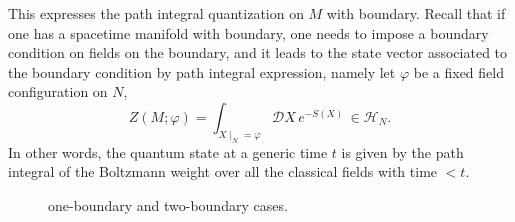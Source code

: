 This expresses the path integral quantization on $M$ with boundary.
Recall that if one has a spacetime manifold with boundary, one needs
to impose a boundary condition on fields on the boundary, and it leads
to the state vector associated to the boundary condition by path integral
expression, namely let $\varphi$ be a fixed field configuration on
$N$,
\begin{equation}
  Z\left(M;\varphi\right)  =  \int_{X\mid_{N}=\varphi}\mathcal{D}X \, e^{-S\left(X\right)} \,  \in  \mathcal{H}_{N}.
\end{equation}
 In other words, the quantum state at a generic time $t$ is given
by the path integral of the Boltzmann weight over all the classical
fields with time $<t$.


\begin{figure}
\centering
  \subfloat[\label{fig:one_bdy}]{
    \begin{tikzpicture}[scale=1] %
        \def\bdyradius{0.8cm}

        \draw[thick] (0,-\bdyradius) arc[start angle=-90,end angle=90,x radius=1.8cm,y radius=\bdyradius] node[left=0.3,pos=0.5] {$M$};
        \draw[very thick, red!50] (0,0) node[black] {$N$} circle[x radius=0.4cm,y radius=\bdyradius] node[above=\bdyradius+0.1cm, black] {\normalsize$\mathcal{H}_N$};

    \end{tikzpicture}
  }
\qquad\qquad
  \subfloat[\label{fig:two_bdy}]{
    \begin{tikzpicture}[scale=1] %
        \def\bdyradius{1cm}

        \draw[thick] (0,-\bdyradius) to[out=0,in=180] (1.4cm,0.3cm-\bdyradius) to[out=0,in=180] (4cm,0.2cm-\bdyradius*1.2);
        \draw[thick] (0,\bdyradius) to[out=0,in=180] (2.2cm,-0.2cm+\bdyradius) to[out=0,in=180] (4cm,0.2cm+\bdyradius*1.2);

        \draw[very thick, red!50] (0,0) node[black] {$-N_1$} circle[x radius=0.4cm,y radius=\bdyradius];
        \draw[very thick, red!50] (4,0.2) node[black] {$N_2$} circle[x radius=0.4cm,y radius=\bdyradius*1.2];

        \node at (2,0) {\small$\tilde M$};

    \end{tikzpicture}
  }
  \caption{one-boundary and two-boundary cases.}
  \label{fig:mfd_w_bdys}
\end{figure}


